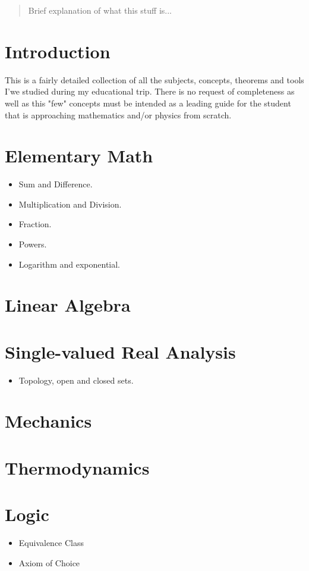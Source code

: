 \documentclass[10pt]{article}
\begin{document}
\begin{abstract}
Brief explanation of what this stuff is... 
\end{abstract}
\section*{Introduction}
This is a fairly detailed collection of all the subjects, concepts, theorems and tools I'we studied during my educational trip. There is no request of completeness as well as this "few" concepts must be intended as a leading guide for the student that is approaching mathematics and/or physics from scratch.
\section{Elementary Math}
\begin{itemize}
	\item Sum and Difference.
	\item Multiplication and Division.
	\item Fraction.
	\item Powers.
	\item Logarithm and exponential.
\end{itemize}
\section{Linear Algebra}
\section{Single-valued Real Analysis}
\begin{itemize}
	\item Topology, open and closed sets.
\end{itemize}
\section{Mechanics}
\section{Thermodynamics}
\section{Logic}
\begin{itemize}
\item Equivalence Class
\item Axiom of Choice
\end{itemize}
\end{document}
